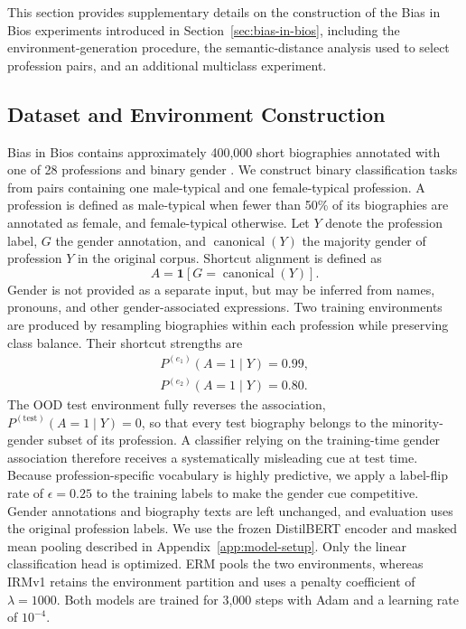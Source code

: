 \documentclass[11pt]{article}
\theoremstyle{definition}
\theoremstyle{plain}
\begin{document}
This section provides supplementary details on the construction of the Bias in Bios experiments introduced in Section~\ref{sec:bias-in-bios}, including the environment-generation procedure, the semantic-distance analysis used to select profession pairs, and an additional multiclass experiment.

\subsection{Dataset and Environment Construction} Bias in Bios contains approximately 400,000 short biographies annotated with one of 28 professions and binary gender \citep{de-arteaga2019bias}. We construct binary classification tasks from pairs containing one male-typical and one female-typical profession. A profession is defined as male-typical when fewer than 50\% of its biographies are annotated as female, and female-typical otherwise. Let $Y$ denote the profession label, $G$ the gender annotation, and $\operatorname{canonical}(Y)$ the majority gender of profession $Y$ in the original corpus. Shortcut alignment is defined as
\begin{equation}
    A = \mathbf{1}\!\left[G=\operatorname{canonical}(Y)\right].
\label{eq:bib-alignment}
\end{equation}
Gender is not provided as a separate input, but may be inferred from names, pronouns, and other gender-associated expressions. Two training environments are produced by resampling biographies within each profession while preserving class balance. Their shortcut strengths are
\begin{equation}
\begin{aligned}
P^{(e_1)}(A=1\mid Y)=0.99, \\
P^{(e_2)}(A=1\mid Y)=0.80.
\end{aligned}
\label{eq:bib-training-environments}
\end{equation}
The OOD test environment fully reverses the association, $P^{(\mathrm{test})}(A=1\mid Y)=0$, so that every test biography belongs to the minority-gender subset of its profession. A classifier relying on the training-time gender association therefore receives a systematically misleading cue at test time. Because profession-specific vocabulary is highly predictive, we apply a label-flip rate of $\epsilon=0.25$ to the training labels to make the gender cue competitive. Gender annotations and biography texts are left unchanged, and evaluation uses the original profession labels. We use the frozen DistilBERT encoder and masked mean pooling described in Appendix~\ref{app:model-setup}. Only the linear classification head is optimized. ERM pools the two environments, whereas IRMv1 retains the environment partition and uses a penalty coefficient of $\lambda=1000$. Both models are trained for 3,000 steps with Adam and a learning rate of $10^{-4}$.
\end{document}
